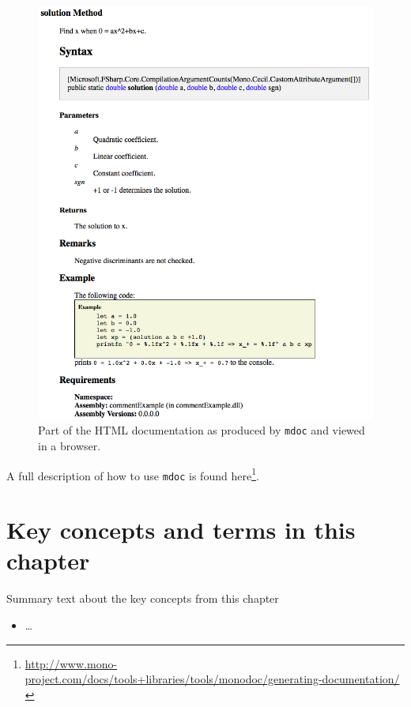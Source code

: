 \documentclass[springer.tex]{subfiles}
\begin{document}
\begin{figure}
  \centering
  \includegraphics[width=\linewidth]{mdocOutput}
  \caption{Part of the HTML documentation as produced by \lstinline[language=console]{mdoc} and viewed in a browser.}
  \label{fig:htmlDocumentExample}
\end{figure}
A full description of how to use \lstinline[language=console]{mdoc} is found here\footnote{\url{http://www.mono-project.com/docs/tools+libraries/tools/monodoc/generating-documentation/}}.

\section{Key concepts and terms in this chapter}
Summary text about the key concepts from this chapter
\begin{itemize}
\item \ldots
\end{itemize}
\end{document}
